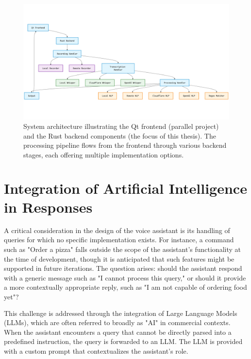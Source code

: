 \begin{figure}[H]
    \centering
    \includegraphics[width=\textwidth]{assets/stackchart}
    \caption{System architecture illustrating the Qt frontend (parallel project)
    and the Rust backend components (the focus of this thesis).
    The processing pipeline flows from the frontend through various backend stages,
    each offering multiple implementation options.}
    \label{fig:design}
\end{figure}

\section{Integration of Artificial Intelligence in Responses}

A critical consideration in the design of the voice assistant is its handling of queries for which no specific implementation exists.
For instance, a command such as "Order a pizza" falls outside the scope of the assistant's functionality at the time of development,
though it is anticipated that such features might be supported in future iterations.
The question arises: should the assistant respond with a generic message such as "I cannot process this query,"
or should it provide a more contextually appropriate reply, such as "I am not capable of ordering food yet"?

This challenge is addressed through the integration of Large Language Models (LLMs), which are often referred to broadly as "AI" in commercial contexts.
When the assistant encounters a query that cannot be directly parsed into a predefined instruction, the query is forwarded to an LLM.
The LLM is provided with a custom prompt that contextualizes the assistant's role.
